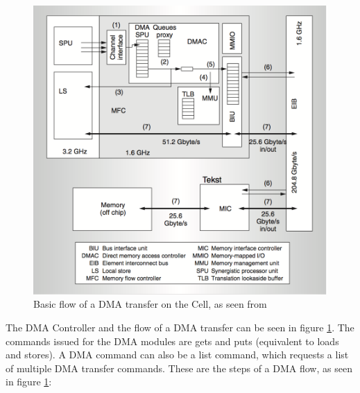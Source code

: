 \begin{figure}[h!]
    \centering
    \includegraphics[width=1\textwidth]{Figures/DMA/CellDMA}
    \caption{Basic flow of a DMA transfer on the Cell, as seen from \cite{cell}}
    \label{fig:CellDMA}
\end{figure}

The DMA Controller and the flow of a DMA transfer can be seen in figure \ref{fig:CellDMA}.
The commands issued for the DMA modules are gets and puts (equivalent to loads and stores).
A DMA command can also be a list command, which requests a list of multiple DMA transfer commands.
These are the steps of a DMA flow, as seen in figure \ref{fig:CellDMA}:

